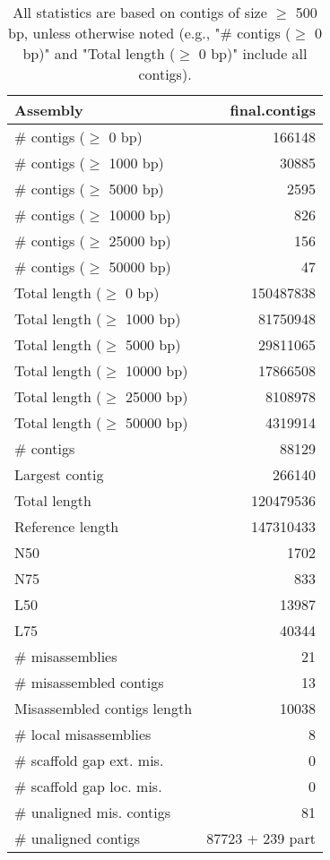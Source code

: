 \documentclass[12pt,a4paper]{article}
\begin{document}
\begin{table}[ht]
\begin{center}
\caption{All statistics are based on contigs of size $\geq$ 500 bp, unless otherwise noted (e.g., "\# contigs ($\geq$ 0 bp)" and "Total length ($\geq$ 0 bp)" include all contigs).}
\begin{tabular}{|l*{1}{|r}|}
\hline
Assembly & final.contigs \\ \hline
\# contigs ($\geq$ 0 bp) & 166148 \\ \hline
\# contigs ($\geq$ 1000 bp) & 30885 \\ \hline
\# contigs ($\geq$ 5000 bp) & 2595 \\ \hline
\# contigs ($\geq$ 10000 bp) & 826 \\ \hline
\# contigs ($\geq$ 25000 bp) & 156 \\ \hline
\# contigs ($\geq$ 50000 bp) & 47 \\ \hline
Total length ($\geq$ 0 bp) & 150487838 \\ \hline
Total length ($\geq$ 1000 bp) & 81750948 \\ \hline
Total length ($\geq$ 5000 bp) & 29811065 \\ \hline
Total length ($\geq$ 10000 bp) & 17866508 \\ \hline
Total length ($\geq$ 25000 bp) & 8108978 \\ \hline
Total length ($\geq$ 50000 bp) & 4319914 \\ \hline
\# contigs & 88129 \\ \hline
Largest contig & 266140 \\ \hline
Total length & 120479536 \\ \hline
Reference length & 147310433 \\ \hline
N50 & 1702 \\ \hline
N75 & 833 \\ \hline
L50 & 13987 \\ \hline
L75 & 40344 \\ \hline
\# misassemblies & 21 \\ \hline
\# misassembled contigs & 13 \\ \hline
Misassembled contigs length & 10038 \\ \hline
\# local misassemblies & 8 \\ \hline
\# scaffold gap ext. mis. & 0 \\ \hline
\# scaffold gap loc. mis. & 0 \\ \hline
\# unaligned mis. contigs & 81 \\ \hline
\# unaligned contigs & 87723 + 239 part \\ \hline

\end{tabular}
\end{center}
\end{table}
\end{document}
